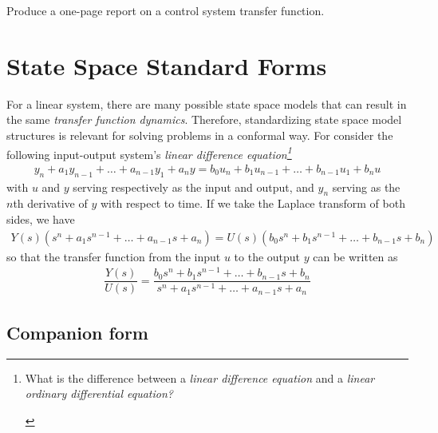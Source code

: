 \begin{homework}
	Produce a one-page report on a control system transfer function.
\end{homework}
%
\section{State Space Standard Forms}
For a linear system, there are many possible state space models that can result in the same \textit{transfer function dynamics}. Therefore, standardizing state space model structures is 
relevant for solving problems in a conformal way. For consider the following input-output system's \textit{linear difference equation\footnote{\begin{quiz}
			What is the difference between a \textit{linear difference equation} and a \textit{linear ordinary differential equation?}
\end{quiz}}}
%
\begin{align}
	y_n + a_1 y_{n-1}  + \ldots + a_{n-1} y_1 + a_n y = b_0 u_n + b_1 u_{n-1} + \ldots + b_{n-1} u_1 + b_n u
\end{align}
%
with $u$ and $y$ serving respectively as the input and output, and $y_n$ serving as the $n$th derivative of $y$ with respect to time. If we take the Laplace transform of both sides, we have
%
\begin{align}
	Y(s) \left(s^n + a_1s^{n-1}+\ldots + a_{n-1}s + a_n\right) = U(s)\left(b_0 s^n + b_1 s^{n-1} + \ldots + b_{n-1} s + b_n\right)
\end{align}
%
so that the transfer function from the input $u$ to the output $y$ can be written as 
%
\begin{align}
	\dfrac{Y(s)}{U(s)} = \dfrac{b_0 s^n + b_1 s^{n-1} + \ldots + b_{n-1} s + b_n}{s^n + a_1s^{n-1}+\ldots + a_{n-1}s + a_n}
	\label{eq:transfer_fcn}
\end{align}

\subsection{Companion form}

